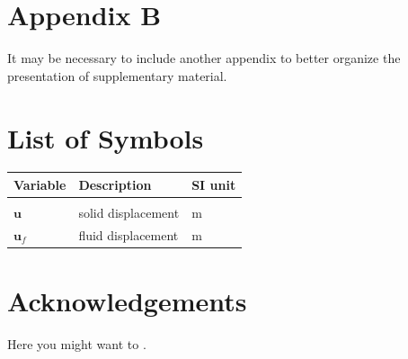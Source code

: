 \documentclass{Configuration_Files/PoliMi3i_thesis}
\begin{document}
\chapter{Appendix B}
It may be necessary to include another appendix to better organize the presentation of supplementary material.


\listoffigures

\listoftables

\chapter*{List of Symbols} %
\begin{table}[H]
    \centering
    \begin{tabular}{lll}
        \textbf{Variable} & \textbf{Description} & \textbf{SI unit} \\\hline\\[-9px]
        $\bm{u}$ & solid displacement & m \\[2px]
        $\bm{u}_f$ & fluid displacement & m \\[2px]
    \end{tabular}
\end{table}

\chapter*{Acknowledgements}
Here you might want to .


\cleardoublepage
\end{document}
